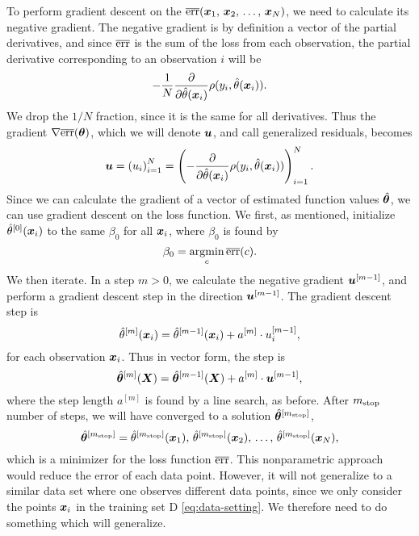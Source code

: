 To perform gradient descent on the $\overline{\text{err}}(\bm{x}_1,\,\bm{x}_2,\,\ldots,\,\bm{x}_N)$, we need to calculate its negative gradient.
The negative gradient is by definition a vector of the partial derivatives, and since $\overline{\text{err}}$ is the sum of the loss from each observation, the partial derivative corresponding to an observation $i$ will be
\begin{equation*}
    -\frac{1}{N}\frac{\partial}{\partial\hat{\theta}(\bm{x}_i)} \rho(y_i,\hat{\theta}(\bm{x}_i)).
\end{equation*}
We drop the $1/N$ fraction, since it is the same for all derivatives.
Thus the gradient $\nabla \overline{\text{err}}(\boldsymbol{\theta})$, which we will denote $\bm{u}$, and call generalized residuals, becomes
\begin{equation*}
    \bm{u}=\left(u_i\right)_{i=1}^N=\left(-\frac{\partial}{\partial \hat{\theta}(\bm{x}_i)}\rho(y_i, \hat{\theta}(\bm{x}_i))\right)_{i=1}^N.
\end{equation*}
Since we can calculate the gradient of a vector of estimated function values $\hat{\boldsymbol{\theta}}$, we can use gradient descent on the loss function.
We first, as mentioned, initialize $\hat{\theta}^{[0]}(\bm{x}_i)$ to the same $\beta_0$ for all $\bm{x}_i$, where $\beta_0$ is found by
\begin{equation*}
    \beta_0=\operatorname*{argmin}_{c}\overline{\text{err}}(c).
\end{equation*}
We then iterate.
In a step $m>0$, we calculate the negative gradient $\bm{u}^{[m-1]}$, and perform a gradient descent step in the direction $\bm{u}^{[m-1]}$.
The gradient descent step is
\begin{equation*}
    \hat{\theta}^{[m]}(\bm{x}_i)=\hat{\theta}^{[m-1]}(\bm{x}_i)+a^{[m]}\cdot u_i^{[m-1]},
\end{equation*}
for each observation $\bm{x}_i$.
Thus in vector form, the step is
\begin{equation*}
    \hat{\boldsymbol{\theta}}^{[m]}(\bm{X})=\hat{\boldsymbol{\theta}}^{[m-1]}(\bm{X})+a^{[m]}\cdot \bm{u}^{[m-1]},
\end{equation*}
where the step length $a^{[m]}$ is found by a line search, as before.
After $m_{\text{stop}}$ number of steps, we will have converged to a solution $\hat{\boldsymbol{\theta}}^{[m_{\text{stop}}]}$,
\begin{equation*}
    \hat{\boldsymbol{\theta}}^{[m_{\text{stop}}]}=\hat{\theta}^{[m_{\text{stop}}]}(\bm{x}_1),\,\hat{\theta}^{[m_{\text{stop}}]}(\bm{x}_2),\,\ldots,\,\hat{\theta}^{[m_{\text{stop}}]}(\bm{x}_N),
\end{equation*}
which is a minimizer for the loss function $\overline{\text{err}}$.
This nonparametric approach would reduce the error of each data point.
However, it will not generalize to a similar data set where one observes different data points, since we only consider the points $\bm{x}_i$ in the training set D \ref{eq:data-setting}.
We therefore need to do something which will generalize.

